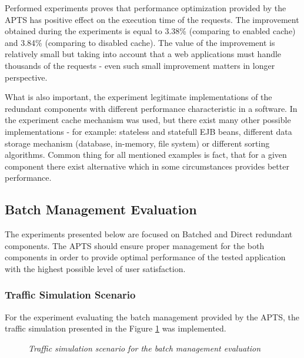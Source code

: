 \documentclass[12pt,a4paper]{article}
\begin{document}
Performed experiments proves that performance optimization provided by the APTS has positive effect on the execution time of the requests. The improvement obtained during the experiments is equal to 3.38\% (comparing to enabled cache) and 3.84\% (comparing to disabled cache). The value of the improvement is relatively small but taking into account that a web applications must handle thousands of the requests - even such small improvement matters in longer perspective.  

What is also important, the experiment legitimate implementations of the redundant components with different performance characteristic in a software. In the experiment cache mechanism was used, but there exist many other possible implementations - for example: stateless and statefull EJB beans, different data storage mechanism (database, in-memory, file system) or different sorting algorithms. Common thing for all mentioned examples is fact, that for a given component there exist alternative which in some circumstances provides better performance.     

 

\subsection{Batch Management Evaluation}

The experiments presented below are focused on Batched and Direct redundant components. The APTS should ensure proper management for the both components in order to provide optimal performance of the tested application with the highest possible level of user satisfaction.  

\subsubsection{Traffic Simulation Scenario} \label{batchsimulationscenario}

For the experiment evaluating the batch management provided by the APTS, the traffic simulation presented in the Figure \ref{trafficbatch} was implemented.

\begin{figure}[!htb]
\begin{center}
\end{center}
\caption{\textit{Traffic simulation scenario for the batch management evaluation}} \label{trafficbatch}
\end{figure}
\end{document}
